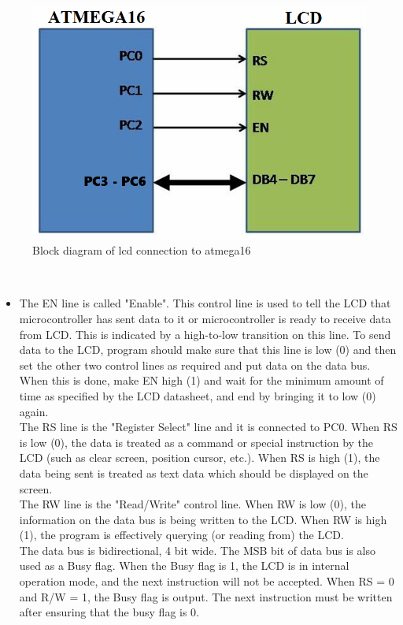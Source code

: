 \documentclass[a4paper,12pt,oneside]{book}
\begin{document}
	\hfill\\
	\begin{figure}[h!]
		\includegraphics[width=\textwidth]{./HardwareManual/lcd.png}
		\caption{Block diagram of lcd connection to atmega16}
	\end{figure}	
	\hfill\\
	
	\begin{itemize}
	\item {
		The EN line is called "Enable". This control line is used to tell the
		LCD that microcontroller has sent data to it or microcontroller is ready to receive data from
		LCD. This is indicated by a high-to-low transition on this line. To send data to the LCD, program
		should make sure that this line is low (0) and then set the other two control lines as required and
		put data on the data bus. When this is done, make EN high (1) and wait for the minimum amount
		of time as specified by the LCD datasheet, and end by bringing it to low (0) again.\\
		The RS line is the "Register Select" line and it is connected to PC0. When RS is low (0), the data
		is treated as a command or special instruction by the LCD (such as clear screen, position cursor,
		etc.). When RS is high (1), the data being sent is treated as text data which should be displayed
		on the screen.\\
		The RW line is the "Read/Write" control line. When RW is low (0),
		the information on the data bus is being written to the LCD. When RW is high (1), the program
		is effectively querying (or reading from) the LCD.\\
		The data bus is bidirectional, 4 bit wide.
		The MSB bit of data bus is also used as a Busy flag. When the Busy flag is 1, the LCD is
		in internal operation mode, and the next instruction will not be accepted. When RS = 0 and R/W
		= 1, the Busy flag is output. The next instruction must be written after ensuring that the
		busy flag is 0.
	}
	\end{itemize}
\end{document}
